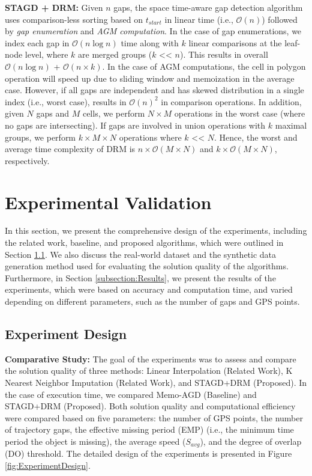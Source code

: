 \documentclass[acmsmall]{acmart}
\begin{document}
\textbf{STAGD + DRM:} Given $n$ gaps, the space time-aware gap detection algorithm uses comparison-less sorting based on $t_{start}$ in linear time (i.e., $\mathcal{O}(n)$) followed by \textit{gap enumeration} and \textit{AGM computation}. In the case of gap enumerations, we index each gap in $\mathcal{O}(n\log{}n)$ time along with $k$ linear comparisons at the leaf-node level, where $k$ are merged groups ($k$ << $n$). This results in overall $\mathcal{O}(n\log{}n)$ + $\mathcal{O}(n \times k)$. In the case of AGM computations, the cell in polygon operation will speed up due to sliding window and memoization in the average case. However, if all gaps are independent and has skewed distribution in a single index (i.e., worst case), results in $\mathcal{O}(n)^{2}$ in comparison operations. In addition, given $N$ gaps and $M$ cells, we perform $N \times M$ operations in the worst case (where no gaps are intersecting). If gaps are involved in union operations with $k$ maximal groups, we perform $k \times M \times N$ operations where $k$ << $N$. Hence, the worst and average time complexity of DRM is $n \times \mathcal{O}(M \times N)$ and $k \times \mathcal{O}(M \times N)$, respectively.

\section{Experimental Validation}
\label{section:validation}
In this section, we present the comprehensive design of the experiments, including the related work, baseline, and proposed algorithms, which were outlined in Section \ref{subsection:ExperimentDesign}. We also discuss the real-world dataset \cite{aisdataUS} and the synthetic data generation method used for evaluating the solution quality of the algorithms. Furthermore, in Section \ref{subsection:Results}, we present the results of the experiments, which were based on accuracy and computation time, and varied depending on different parameters, such as the number of gaps and GPS points.

\subsection{Experiment Design}
\label{subsection:ExperimentDesign}

\textbf{Comparative Study:} The goal of the experiments was to assess and compare the solution quality of three methods: Linear Interpolation (Related Work), K Nearest Neighbor Imputation (Related Work), and STAGD+DRM (Proposed). In the case of execution time, we compared Memo-AGD (Baseline) and STAGD+DRM (Proposed). Both solution quality and computational efficiency were compared based on five parameters: the number of GPS points, the number of trajectory gaps, the effective missing period (EMP) (i.e., the minimum time period the object is missing), the average speed ($S_{avg}$), and the degree of overlap (DO) threshold. The detailed design of the experiments is presented in Figure \ref{fig:ExperimentDesign}.
\end{document}
